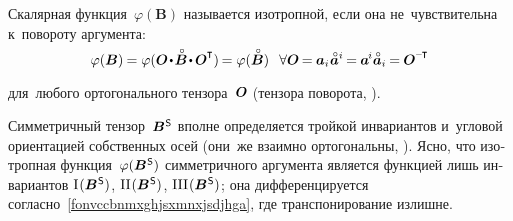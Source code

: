 \begin{otherlanguage}{russian}
Скалярная функция~${\varphi(\bm{B})}$ называется изотропной, если она не~чувствительна к~повороту аргумента:
\nopagebreak\vspace{.1em}\begin{equation*}
\varphi(\bm{B}) \hspace{-0.12ex} = \varphi ( \rotationtensor \narrowdotp \smash{\mathcircabove{\bm{B}}} \narrowdotp \hspace{.15ex} \rotationtensor^{\hspace{-0.06ex}\T} ) \hspace{-0.2ex} = \varphi(\smash{\mathcircabove{\bm{B}}}) \;\;\,
\forall \rotationtensor \hspace{-0.2ex}=\hspace{-0.1ex} \bm{a}_i \hspace{.1ex} \mathcircabove{\bm{a}}^i \hspace{-0.2ex} = \hspace{-0.1ex} \bm{a}^{\hspace{-0.16ex}i} \mathcircabove{\bm{a}}_i \hspace{-0.16ex} = \hspace{-0.1ex} \rotationtensor^{\hspace{-0.06ex}\expminusT}
\end{equation*}
\par\vspace{-0.25em}\noindent для~любого ортогонального тензора~$\bm{O}$ (тензора поворота, ).

Симметричный тензор~${\bm{B}^{\mathsf{\hspace{0.1ex}S}}}$ вполне определяется тройкой инвариантов и~угловой ориентацией собственных осей (они~же взаимно ортогональны, ). Ясно, что изотропная функция~${\varphi(\bm{B}^{\mathsf{\hspace{0.1ex}S}})}$ симметричного аргумента является функцией лишь инвариантов ${\mathrm{I}\hspace{0.16ex}({\bm{B}^{\mathsf{\hspace{0.1ex}S}}})}$, ${\mathrm{II}\hspace{0.16ex}({\bm{B}^{\mathsf{\hspace{0.1ex}S}}})}$, ${\mathrm{III}\hspace{0.16ex}({\bm{B}^{\mathsf{\hspace{0.1ex}S}}})}$; она дифференцируется согласно~\eqref{fonvccbnmxghjsxmnxjsdjhga}, где транспонирование излишне.

\end{otherlanguage}

